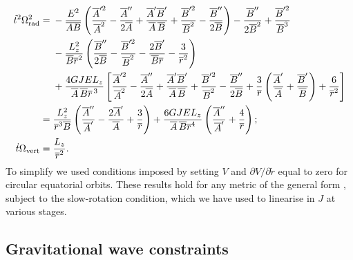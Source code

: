 \begin{align}
\dot{t}^2\Omega_\mathrm{rad}^2 = {} & -\dfrac{E^2}{\overline{A}\overline{B}} \left( \dfrac{\overline{A}'^2}{\overline{A}^2} - \dfrac{\overline{A}''}{2\overline{A}} + \dfrac{\overline{A}'\overline{B}'}{\overline{A}\,\overline{B}} + \dfrac{\overline{B}'^2}{\overline{B}^2} - \dfrac{\overline{B}''}{2\overline{B}} \right) - \dfrac{\overline{B}''}{2\overline{B}^2} +  \dfrac{\overline{B}'^2}{\overline{B}^3} \nonumber \\*
 & - {} \dfrac{L_z^2}{\overline{B}\overline{r}^2} \left(\dfrac{\overline{B}''}{2\overline{B}} - \dfrac{\overline{B}'^2}{\overline{B}^2} - \dfrac{2\overline{B}'}{\overline{B}\overline{r}}-\dfrac{3}{\overline{r}^2} \right) \nonumber \\
  & + \dfrac{4GJEL_z}{\overline{A}\,\overline{B}\overline{r}^{\,3}} \left[ \dfrac{\overline{A}'^2}{\overline{A}^2} - \dfrac{\overline{A}''}{2\overline{A}} + \dfrac{\overline{A}'\overline{B}'}{\overline{A}\,\overline{B}} + \dfrac{\overline{B}'^2}{\overline{B}^2} - \dfrac{\overline{B}''}{2\overline{B}} + \dfrac{3}{\overline{r}}\left(\dfrac{\overline{A}'}{\overline{A}}+\dfrac{\overline{B}'}{\overline{B}}\right) + \dfrac{6}{\overline{r}^2}\right] \label{eq:long_epi} \\
 = {} &  \dfrac{L_z^2}{\overline{r}^3\overline{B}}\left(\dfrac{\overline{A}''}{\overline{A}'} - \dfrac{2\overline{A}'}{\overline{A}} + \dfrac{3}{\overline{r}}\right) +\dfrac{6GJEL_z}{\overline{A}\,\overline{B} \overline{r}^4} \left(\dfrac{\overline{A}''}{\overline{A}'} + \dfrac{4}{\overline{r}}\right); \\
\dot{t}\Omega_\mathrm{vert} = {} & \dfrac{L_z}{\overline{r}^2}.
\end{align}
To simplify  we used conditions imposed by setting $V$ and $\partial V/\partial \widetilde{r}$ equal to zero for circular equatorial orbits. These results hold for any metric of the general form , subject to the slow-rotation condition, which we have used to linearise in $J$ at various stages.

\subsection{Gravitational wave constraints}\label{sec:GW-f-R}

